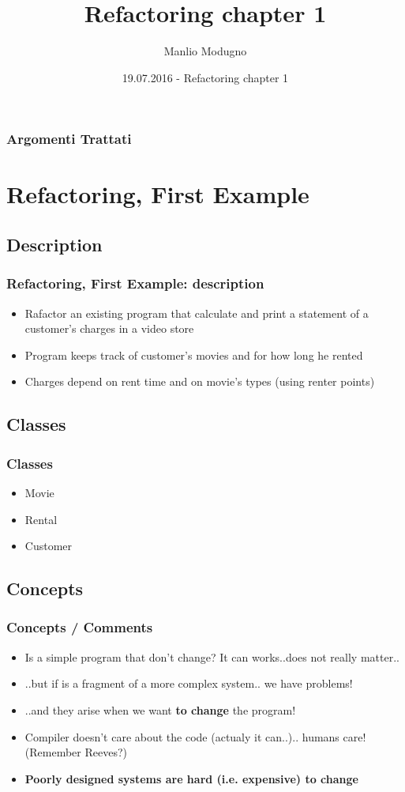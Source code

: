 \documentclass{beamer}
\title{Refactoring chapter 1}
\author{Manlio Modugno}
\institute[GMTechnologies]
\date[19.07.2016] 
{19.07.2016 - Refactoring chapter 1}
\begin{document}
\begin{frame}
  \titlepage
\end{frame}

\begin{frame}
  \frametitle{Argomenti Trattati}
  \tableofcontents
\end{frame}

\section{Refactoring, First Example}
\subsection{Description}
\begin{frame}
  \frametitle{Refactoring, First Example: description}
  \begin{itemize}
  		\item Rafactor an existing program that calculate and print a statement of a customer's charges in a video store
		\item Program keeps track of customer's movies and for how long he rented
		\item Charges depend on rent time and on movie's types (using renter points)
  \end{itemize}
\end{frame}

\subsection{Classes}
\begin{frame}
  \frametitle{Classes}
  \begin{itemize}
  		\item Movie
		\item Rental
		\item Customer
  \end{itemize}
\end{frame}

\subsection{Concepts}
\begin{frame}
  \frametitle{Concepts / Comments}
  \begin{itemize}
  		\item<+-> Is a simple program that don't change? It can works..does not really matter..
		\item<+-> ..but if is a fragment of a more complex system.. we have problems!
		\item<+-> ..and they arise when we want \textbf{to change} the program!
		\item<+-> Compiler doesn't care about the code (actualy it can..).. humans care! (Remember Reeves?)
		\item<+-> \textbf{Poorly designed systems are hard (i.e. expensive) to change}
  \end{itemize}
\end{frame}
\end{document}

